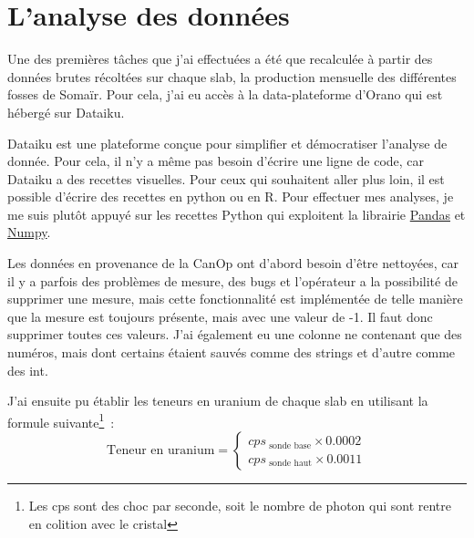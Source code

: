 
\section{L'analyse des données}
Une des premières tâches que j'ai effectuées a été que recalculée à partir des données brutes récoltées sur chaque slab, la production mensuelle des différentes fosses de Somaïr. Pour cela, j'ai eu accès  à la data-plateforme d’Orano qui est hébergé sur Dataiku. 

Dataiku est une plateforme conçue pour simplifier et démocratiser l'analyse de donnée. Pour cela, il n'y a même pas besoin d'écrire une ligne de code, car Dataiku a des recettes visuelles. Pour ceux qui souhaitent aller plus loin, il est possible d'écrire des recettes en python ou en R. Pour effectuer mes analyses, je me suis plutôt appuyé sur les recettes Python qui exploitent la librairie \href{https://pandas.pydata.org/}{Pandas} et \href{https://numpy.org/}{Numpy}.

Les données en provenance de la CanOp ont d'abord besoin d'être nettoyées, car il y a parfois des problèmes de mesure, des bugs et l'opérateur a la possibilité de supprimer une mesure, mais cette fonctionnalité est implémentée de telle manière que la mesure est toujours présente, mais avec une valeur de -1. Il faut donc supprimer toutes ces valeurs. J'ai également eu une colonne ne contenant que des numéros, mais dont certains étaient sauvés comme des strings et d'autre comme des int.

J'ai ensuite pu établir les teneurs en uranium de chaque slab en utilisant la formule suivante\footnote{Les cps sont des choc par seconde, soit le nombre de photon qui sont rentre en colition avec le cristal}~:
\[
    \text{Teneur en uranium} = 
    \begin{cases}
        cps_{\text{ sonde base}} \times 0.0002 \\
        cps_{\text{ sonde haut}} \times 0.0011
    \end{cases}
\]


